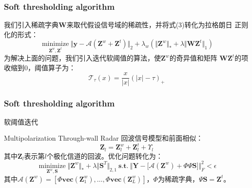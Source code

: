\documentclass[12pt]{beamer}
\begin{document}
\begin{frame}
  \frametitle{Soft thresholding algorithm}
  我们引入稀疏字典$\mathbf{W}$来取代假设信号域的稀疏性，并将式(3)转化为拉格朗日
  正则化的形式：
  \begin{equation}
\mathop\text{minimize}\limits_{\mathbf{Z}^{w},\mathbf{Z}^{t}} \Vert \mathbf{y}-\mathcal{A}(\mathbf{Z}^{w}+\mathbf{Z}^{t})\Vert_{2}+\lambda_{w}(\Vert \mathbf{Z}^{w}\Vert_{*}+\lambda\Vert \mathbf{WZ}^{t}\Vert_{1})
  \end{equation}
  为解决上面的问题，我们引入迭代软阈值的算法，使$\mathbf{Z}^w$的奇异值和矩阵
  $\mathbf{WZ}^t$的项收缩到0，阈值算子为：
  \begin{equation*}
	\mathcal{T}_{\tau}(x)=\frac{x}{\vert x\vert }(\vert x\vert -\tau)_{+}
  \end{equation*}
\end{frame}
\begin{frame}
  \frametitle{Soft thresholding algorithm}
  \scriptsize
  \begin{algorithm}[H]  
	\caption{软阈值迭代}
	\label{alg:1}
	\begin{algorithmic}[1]
	  \ELSE
	  \ENDIF
	\end{algorithmic}
  \end{algorithm}
\end{frame}
\begin{frame}{Multipolarization Through-wall Radar}
  回波信号模型和前面相似：
  \begin{equation}
	\mathbf{Z}_l=\mathbf Z^{w}_l+\mathbf{Z}_l^{t}+\Upsilon_l
  \end{equation}
  其中$\mathbf{Z}_l$表示第$l$个极化信道的回波。优化问题转化为：
  \begin{equation}
	\mathop{\text{minimize}}\limits_{\mathbf{Z}^{w},\mathbf{S}} \Vert \mathbf{Z}^{w}\Vert_{*}+\lambda\Vert \mathbf{S}^T\Vert_{2,1}\ \mathbf{s.t}.\ \Big\Vert \mathbf{Y}-\big[\mathcal{A}(\mathbf{Z}^{w})+\Phi\Psi\mathbf{S}\big]\Big\Vert_{F}^2 < \epsilon
  \end{equation}
  其中$\mathcal A(\mathbf{Z}^w) = [\Phi\mathbf{vec}(\mathbf{Z}_1^w),\dots,\Phi\mathbf{vec}(\mathbf{Z}_L^w)] $，$\Phi$为稀疏字典，$\Psi\mathbf S = \mathbf Z^t$。
\end{frame}
\end{document}
